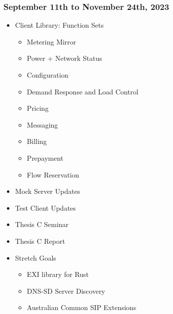 \subsubsection{September 11th to November 24th, 2023}
\begin{itemize}
    \item Client Library: Function Sets
    \begin{itemize}
        \item Metering Mirror
        \item Power + Network Status
        \item Configuration
        \item Demand Response and Load Control
        \item Pricing
        \item Messaging
        \item Billing
        \item Prepayment
        \item Flow Reservation
    \end{itemize}
    \item Mock Server Updates
    \item Test Client Updates
    \item Thesis C Seminar
    \item Thesis C Report
    \item Stretch Goals
    \begin{itemize}
        \item EXI library for Rust
        \item DNS-SD Server Discovery
        \item Australian Common SIP Extensions
    \end{itemize}
\end{itemize}

